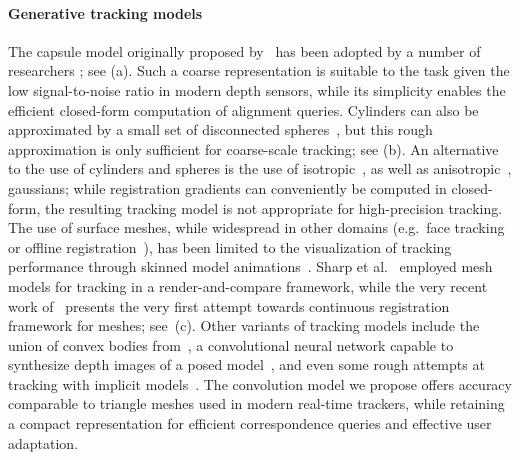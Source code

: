 \paragraph{Generative tracking models}
The capsule model originally proposed by~\cite{rehg1994tracking} has been adopted by a number of researchers \cite{oiko2011hand,schroder2014real,fleishman2015icpik,tagliasacchi2015robust}; see (a). Such a coarse representation is suitable to the task given the low signal-to-noise ratio in modern depth sensors, while its simplicity enables the efficient closed-form computation of alignment queries. Cylinders can also be approximated by a small set of disconnected spheres~\cite{qian2014realtime}, but this rough approximation is only sufficient for coarse-scale tracking; see (b). An alternative to the use of cylinders and spheres is the use of isotropic~\cite{sridhar2013multicam,sridhar2015fast}, as well as anisotropic~\cite{sridhar2014anisotropic}, gaussians; while registration gradients can conveniently be computed in closed-form, the resulting tracking model is not appropriate for high-precision tracking.
% 
%
The use of surface meshes, while widespread in other domains (e.g.\ face tracking~\cite{bouaziz2013online} or offline registration~\cite{wang2013physics,loper_eccv14}), has been limited to the visualization of tracking performance through skinned model animations~\cite{tompson2014real,schroder2014real}. Sharp et al.~ employed mesh models for tracking in a render-and-compare framework, while the very recent work of~\cite{taylor2016concerto} presents the very first attempt towards continuous registration framework for meshes; see~(c).
%
Other variants of tracking models include the union of convex bodies from~\cite{melax2013dynamics}, a convolutional neural network capable to synthesize depth images of a posed model~\cite{oberweger2015feedback}, and even some rough attempts at tracking with implicit models~\cite{fua2003soft}.
% 
The convolution model we propose offers accuracy comparable to triangle meshes used in modern real-time trackers, while retaining a compact representation for efficient correspondence queries and effective user adaptation.

